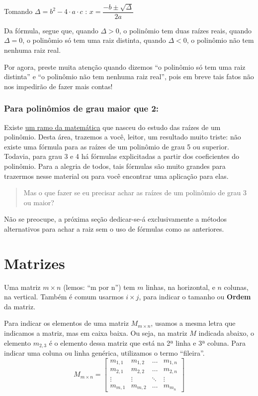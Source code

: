 \documentclass[
  letterpaper,
  DIV=11,
  numbers=noendperiod]{scrreprt}
\begin{document}
Tomando \(\Delta = b^2-4 \cdot a \cdot c\) :
\(x=\dfrac{-b \pm \sqrt{\Delta}}{2a}\)

Da fórmula, segue que, quando \(\Delta>0\), o polinômio tem duas raízes
reais, quando \(\Delta=0\), o polinômio só tem uma raiz distinta, quando
\(\Delta<0\), o polinômio não tem nenhuma raiz real.

Por agora, preste muita atenção quando dizemos ``o polinômio só tem uma
raiz distinta'' e ``o polinômio não tem nenhuma raiz real'', pois em
breve tais fatos não nos impedirão de fazer mais contas!

\subsection{Para polinômios de grau maior que
2:}\label{para-polinuxf4mios-de-grau-maior-que-2}

Existe \href{https://en.wikipedia.org/wiki/Galois_theory}{um ramo da
matemática} que nasceu do estudo das raízes de um polinômio. Desta área,
trazemos a você, leitor, um resultado muito triste: não existe uma
fórmula para as raízes de um polinômio de grau 5 ou superior. Todavia,
para grau 3 e 4 há fórmulas explicitadas a partir dos coeficientes do
polinômio. Para a alegria de todos, tais fórmulas são muito grandes para
trazermos nesse material ou para você encontrar uma aplicação para elas.

\begin{quote}
Mas o que fazer se eu precisar achar as raízes de um polinômio de grau 3
ou maior?
\end{quote}

Não se preocupe, a próxima seção dedicar-se-á exclusivamente a métodos
alternativos para achar a raiz sem o uso de fórmulas como as anteriores.

\chapter{Matrizes}\label{matrizes}

Uma matriz \(m \times n\) (lemos: ``m por n'') tem \(m\) linhas, na
horizontal, e \(n\) colunas, na vertical. Também é comum usarmos
\(i \times j\), para indicar o tamanho ou \textbf{Ordem} da matriz.

Para indicar os elementos de uma matriz \(M_{m\times n}\), usamos a
mesma letra que indicamos a matriz, mas em caixa baixa. Ou seja, na
matriz \(M\) indicada abaixo, o elemento \(m_{2,3}\) é o elemento dessa
matriz que está na 2ª linha e 3ª coluna. Para indicar uma coluna ou
linha genérica, utilizamos o termo ``fileira''. \[
M_{m\times n}=
\begin{bmatrix}
    m_{1,1} & m_{1,2} & \dots & m_{1,n} \\
    m_{2,1} & m_{2,2} & \dots & m_{2,n} \\
    \vdots  & \vdots & \ddots & \vdots \\
    m_{m,1} & m_{m,2} & \dots & m_{m_n}
\end{bmatrix}
\]
\end{document}
